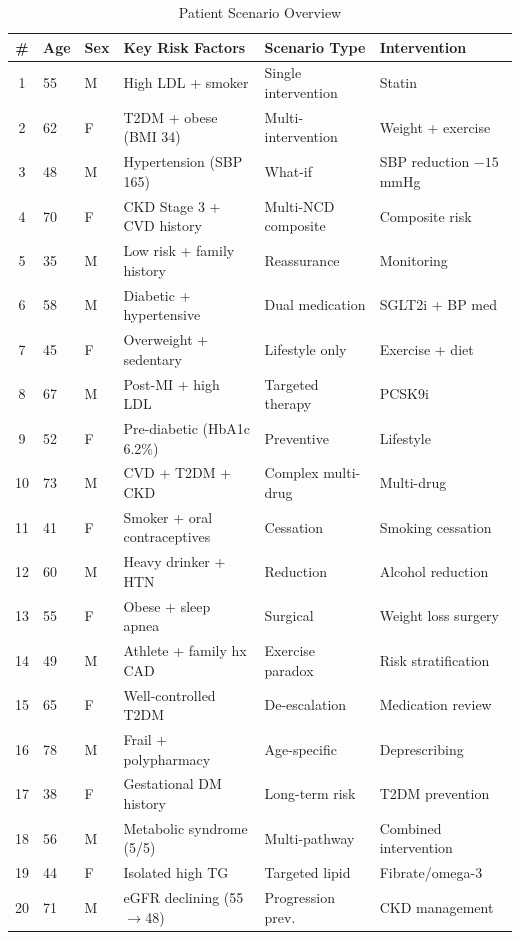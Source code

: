 \documentclass[runningheads,a4paper]{llncs}
\begin{document}
\begin{table}[h]
\centering
\caption{Patient Scenario Overview}
\footnotesize
\begin{tabular}{clllll}
\toprule
\textbf{\#} & \textbf{Age} & \textbf{Sex} & \textbf{Key Risk Factors} & \textbf{Scenario Type} & \textbf{Intervention} \\
\midrule
1  & 55 & M & High LDL + smoker          & Single intervention & Statin \\
2  & 62 & F & T2DM + obese (BMI 34)      & Multi-intervention  & Weight + exercise \\
3  & 48 & M & Hypertension (SBP 165)     & What-if             & SBP reduction $-15$ mmHg \\
4  & 70 & F & CKD Stage 3 + CVD history  & Multi-NCD composite & Composite risk \\
5  & 35 & M & Low risk + family history   & Reassurance         & Monitoring \\
6  & 58 & M & Diabetic + hypertensive    & Dual medication     & SGLT2i + BP med \\
7  & 45 & F & Overweight + sedentary     & Lifestyle only      & Exercise + diet \\
8  & 67 & M & Post-MI + high LDL         & Targeted therapy    & PCSK9i \\
9  & 52 & F & Pre-diabetic (HbA1c 6.2\%) & Preventive          & Lifestyle \\
10 & 73 & M & CVD + T2DM + CKD           & Complex multi-drug  & Multi-drug \\
11 & 41 & F & Smoker + oral contraceptives & Cessation         & Smoking cessation \\
12 & 60 & M & Heavy drinker + HTN        & Reduction           & Alcohol reduction \\
13 & 55 & F & Obese + sleep apnea        & Surgical            & Weight loss surgery \\
14 & 49 & M & Athlete + family hx CAD    & Exercise paradox    & Risk stratification \\
15 & 65 & F & Well-controlled T2DM       & De-escalation       & Medication review \\
16 & 78 & M & Frail + polypharmacy       & Age-specific        & Deprescribing \\
17 & 38 & F & Gestational DM history     & Long-term risk      & T2DM prevention \\
18 & 56 & M & Metabolic syndrome (5/5)   & Multi-pathway       & Combined intervention \\
19 & 44 & F & Isolated high TG           & Targeted lipid      & Fibrate/omega-3 \\
20 & 71 & M & eGFR declining (55$\to$48) & Progression prev.   & CKD management \\
\bottomrule
\end{tabular}
\end{table}
\end{document}
